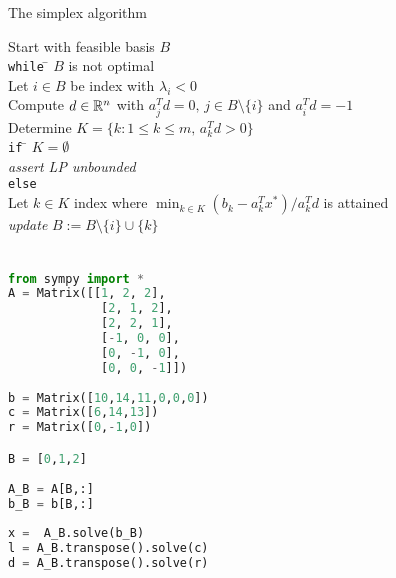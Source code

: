 \begin{frame}{The simplex algorithm}
 \begin{tabbing}
    Start with feasible basis $B$ \\[1ex]
    {\tt while} \= $B$ is not optimal \\ [.7ex]
    \> Let $i \in B$ be index with $\lambda_i<0$ \\
    \> Compute  $d \in \mathbb{R}^n$ with $a_j^T d = 0, \, j \in B \setminus\{i\}$
    and $a_i^T d = -1$ \\ 
    \> Determine $K = \{ k \colon 1 \leq k \leq m, \, a_k^Td >0\}$\\[.7ex]  
    \> {\tt if} \= $K = \emptyset$ \\   
    \> \> \emph{assert LP unbounded} \\
    \> {\tt else} \\
    \> \> Let $k \in K$ index where 
    $
    \displaystyle \min_{k \in K} (b_k - a_k^Tx^*)/a_k^Td
    $
    is attained \\ %
    
    \> \>\emph{update} $B := B \setminus\{i\} \cup \{k\}$             
  \end{tabbing}
  \begin{columns}
    \begin{column}{.5\textwidth}
      
    \end{column}
    \begin{column}{.5\textwidth}
      
    \end{column}       
  \end{columns}
\end{frame}

\begin{frame}[fragile]
 \frametitle{}
{ \scriptsize 
\begin{lstlisting}[language=python]
from sympy import *
A = Matrix([[1, 2, 2],
             [2, 1, 2],
             [2, 2, 1],            
             [-1, 0, 0],
             [0, -1, 0],
             [0, 0, -1]])
 
b = Matrix([10,14,11,0,0,0])
c = Matrix([6,14,13])
r = Matrix([0,-1,0])

B = [0,1,2]
 
A_B = A[B,:] 
b_B = b[B,:]
 
x =  A_B.solve(b_B) 
l = A_B.transpose().solve(c)
d = A_B.transpose().solve(r)
\end{lstlisting}
}

\end{frame}


